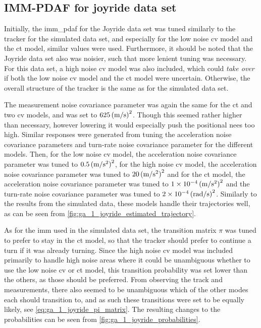 \subsection{IMM-PDAF for joyride data set}
Initially, the \acrshort{imm_pdaf} for the Joyride data set was tuned similarly to the tracker for the simulated data set, and especially for the low noise \acrshort{cv} model and the \acrshort{ct} model, similar values were used. Furthermore, it should be noted that the Joyride data set also was noisier, such that more lenient tuning was necessary. For this data set, a high noise \acrshort{cv} model was also included, which could \textit{take over} if both the low noise \acrshort{cv} model and the \acrshort{ct} model were uncertain. Otherwise, the overall structure of the tracker is the same as for the simulated data set. 

The measurement noise covariance parameter was again the same for the \acrshort{ct} and two \acrshort{cv} models, and was set to $\SI{625}{(\meter\per\second)\squared}$. Though this seemed rather higher than necessary, however lowering it would especially push the positional \acrshort{nees} too high. Similar responses were generated from tuning the acceleration noise covariance parameters and turn-rate noise covariance parameter for the different models. Then, for the low noise \acrshort{cv} model, the acceleration noise covariance parameter was tuned to $\SI{0.5}{(\meter\per\second\squared)\squared}$, for the high noise \acrshort{cv} model, the acceleration noise covariance parameter was tuned to $\SI{20}{(\meter\per\second\squared)\squared}$ and for the \acrshort{ct} model, the acceleration noise covariance parameter was tuned to $\SI{1e-4}{(\meter\per\second\squared)\squared}$ and the turn-rate noise covariance parameter was tuned to $\SI{2e-4}{(\radian\per\second)\squared}$. Similarly to the results from the simulated data, these models handle their trajectories well, as can be seen from \cref{fig:ga_1_joyride_estimated_trajectory}. 

As for the \acrshort{imm} used in the simulated data set, the transition matrix $\pi$ was tuned to prefer to stay in the \acrshort{ct} model, so that the tracker should prefer to continue a turn if it was already turning. Since the high noise \acrshort{cv} model was included primarily to handle high noise areas where it could be unambiguous whether to use the low noise \acrshort{cv} or \acrshort{ct} model, this transition probability was set lower than the others, as those should be preferred. From observing the track and measurements, there also seemed to be unambiguous which of the other modes each should transition to, and as such these transitions were set to be equally likely, see \cref{eq:ga_1_joyride_pi_matrix}. The resulting changes to the probabilities can be seen from \cref{fig:ga_1_joyride_probabilities}. 

